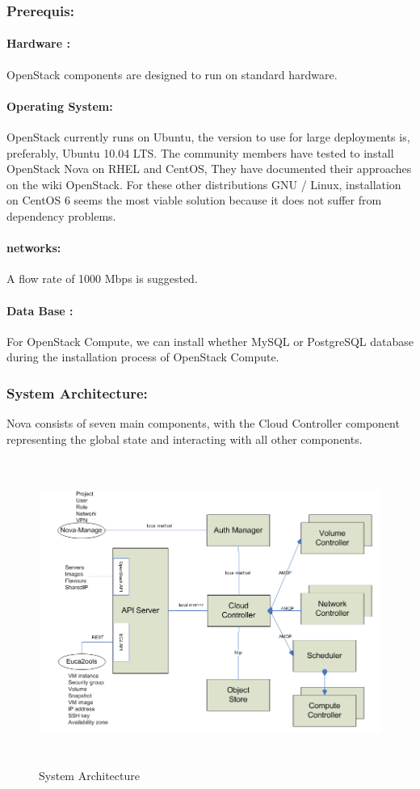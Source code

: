 \subsubsection{ Prerequis:}%
\paragraph{Hardware :} OpenStack components are designed to run on standard hardware.
\paragraph{Operating System:} OpenStack currently runs on Ubuntu, 
the version to use for large deployments is, preferably, Ubuntu 10.04 LTS. The community members have tested to install OpenStack
Nova on RHEL and CentOS, They have documented their approaches on the wiki OpenStack. For these other distributions GNU / Linux, 
installation on CentOS 6 seems the most viable solution because it does not suffer from dependency problems.

\paragraph{networks:} A flow rate of 1000 Mbps is suggested.

\paragraph{Data Base :}For OpenStack Compute, we can install whether  MySQL or PostgreSQL
database during the installation process of OpenStack Compute.

\subsubsection{System Architecture:}

Nova consists of seven main components, with the Cloud Controller component representing the global state and interacting with all other components.

\begin{figure}[!h]
 \center
 \includegraphics[width=12cm, height=10cm]{./images/arch.png}
 \caption{System Architecture}
\end{figure}


